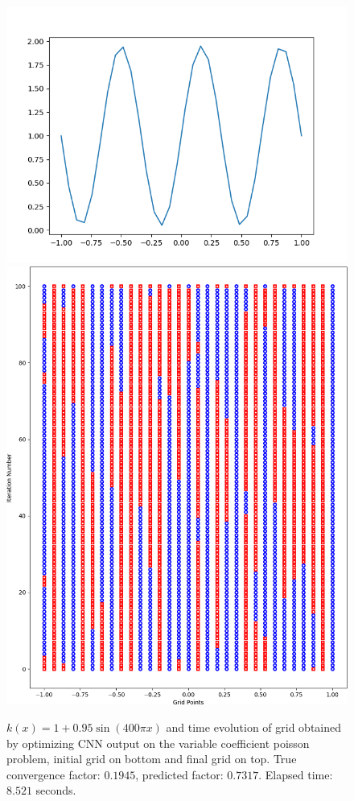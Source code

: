\begin{figure}[h]
  \centering
  \includegraphics[scale=0.5]{figures/grid-opt/poisson_sine_coeffs.png}
  \includegraphics[scale=0.5]{figures/grid-opt/poisson_sine_grid_time.png}
  \caption{$k(x)=1+0.95\sin\left(400\pi x\right)$ and time evolution of grid obtained by optimizing CNN output on the variable coefficient poisson problem, initial grid on bottom and final grid on top.  True convergence factor: $0.1945$, predicted factor: $0.7317$.  Elapsed time: $8.521$ seconds.  }
  \label{fig:optimized_grid_varcoeff}
\end{figure}

